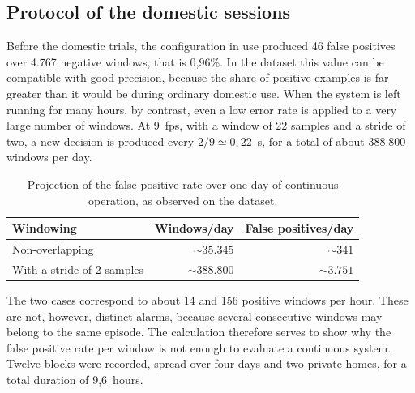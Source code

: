 \subsection{Protocol of the domestic sessions}
\label{sec:protocollo-campo}

Before the domestic trials, the configuration in use produced 46 false positives over 4.767 negative windows, that is 0,96\%. In the dataset this value can be compatible with good precision, because the share of positive examples is far greater than it would be during ordinary domestic use. When the system is left running for many hours, by contrast, even a low error rate is applied to a very large number of windows.
At 9~fps, with a window of 22 samples and a stride of two, a new decision is produced every $2/9 \simeq 0,22$~s, for a total of about 388.800 windows per day.

\begin{table}[ht]
\centering
\caption{Projection of the false positive rate over one day of continuous operation, as observed on the dataset.}
\label{tab:falsi_positivi_giorno}
\begin{tabular}{lrr}
\toprule
\textbf{Windowing} & \textbf{Windows/day} &
\textbf{False positives/day} \\
\midrule
Non-overlapping & $\sim35{.}345$ & $\sim341$ \\
With a stride of 2 samples & $\sim388{.}800$ & $\sim3{.}751$ \\
\bottomrule
\end{tabular}
\end{table}

The two cases correspond to about 14 and 156 positive windows per hour. These are not, however, distinct alarms, because several consecutive windows may belong to the same episode. The calculation therefore serves to show why the false positive rate per window is not enough to evaluate a continuous system. Twelve blocks were recorded, spread over four days and two private homes, for a total duration of 9,6~hours.

